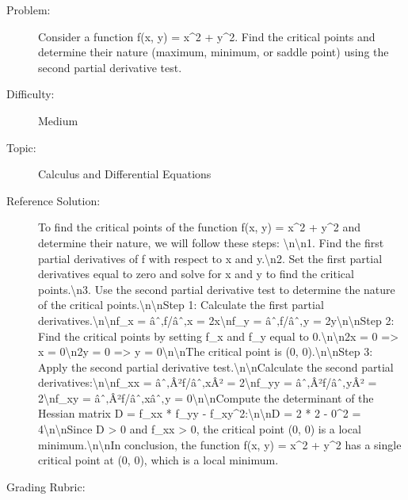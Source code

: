 \documentclass{article}%
\begin{document}
\begin{description}%
\item[Problem: ]%
Consider a function f(x, y) = x\^{}2 + y\^{}2. Find the critical points and determine their nature (maximum, minimum, or saddle point) using the second partial derivative test.%
\item[Difficulty: ]%
Medium%
\item[Topic: ]%
Calculus and Differential Equations%
\item[Reference Solution: ]%
To find the critical points of the function f(x, y) = x\^{}2 + y\^{}2 and determine their nature, we will follow these steps: \textbackslash{}n\textbackslash{}n1. Find the first partial derivatives of f with respect to x and y.\textbackslash{}n2. Set the first partial derivatives equal to zero and solve for x and y to find the critical points.\textbackslash{}n3. Use the second partial derivative test to determine the nature of the critical points.\textbackslash{}n\textbackslash{}nStep 1: Calculate the first partial derivatives.\textbackslash{}n\textbackslash{}nf\_x = âˆ‚f/âˆ‚x = 2x\textbackslash{}nf\_y = âˆ‚f/âˆ‚y = 2y\textbackslash{}n\textbackslash{}nStep 2: Find the critical points by setting f\_x and f\_y equal to 0.\textbackslash{}n\textbackslash{}n2x = 0 => x = 0\textbackslash{}n2y = 0 => y = 0\textbackslash{}n\textbackslash{}nThe critical point is (0, 0).\textbackslash{}n\textbackslash{}nStep 3: Apply the second partial derivative test.\textbackslash{}n\textbackslash{}nCalculate the second partial derivatives:\textbackslash{}n\textbackslash{}nf\_xx = âˆ‚Â²f/âˆ‚xÂ² = 2\textbackslash{}nf\_yy = âˆ‚Â²f/âˆ‚yÂ² = 2\textbackslash{}nf\_xy = âˆ‚Â²f/âˆ‚xâˆ‚y = 0\textbackslash{}n\textbackslash{}nCompute the determinant of the Hessian matrix D = f\_xx * f\_yy {-} f\_xy\^{}2:\textbackslash{}n\textbackslash{}nD = 2 * 2 {-} 0\^{}2 = 4\textbackslash{}n\textbackslash{}nSince D > 0 and f\_xx > 0, the critical point (0, 0) is a local minimum.\textbackslash{}n\textbackslash{}nIn conclusion, the function f(x, y) = x\^{}2 + y\^{}2 has a single critical point at (0, 0), which is a local minimum.%
\item[Grading Rubric: ]%

\end{description}
\end{document}
